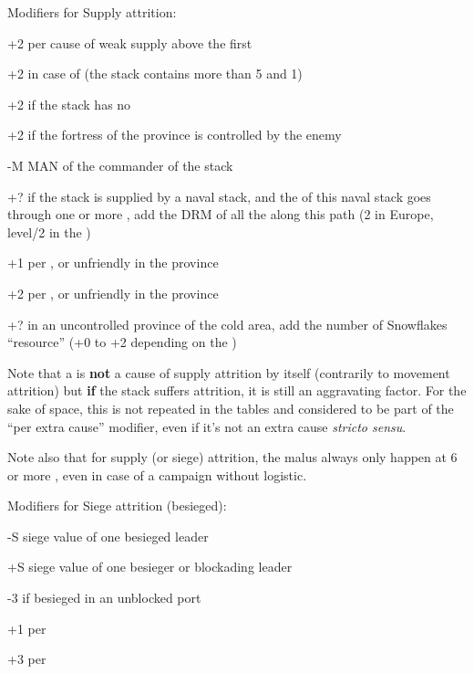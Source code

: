 
Modifiers for Supply attrition:
\begin{modlist}
\item[+2] per cause of weak supply above the first
\item[+2] in case of  (the stack contains more than 5\LD
  and 1\Pasha)
\item[+2] if the stack has no \LoS
\item[+2] if the fortress of the province is controlled by the enemy
\item[-M] MAN of the commander of the stack
\item[+?] if the stack is supplied by a naval stack, and the \LoS of this
  naval stack goes through one or more \StraitFort, add the DRM of all the
  \StraitFort along this path (2 in Europe, level/2 in the \ROTW)
\item[+1] per \PILLAGE\facemoins, \REVOLT\facemoins or unfriendly
  \REBELLION\facemoins in the province
\item[+2] per \PILLAGE\faceplus, \REVOLT\faceplus or unfriendly
  \REBELLION\faceplus in the province
\item[+?] in an uncontrolled province of the \ROTW cold area, add the number
  of Snowflakes ``resource'' (+0 to +2 depending on the \Area)
\end{modlist}

\begin{designnote}
  Note that a  is \textbf{not} a cause of supply attrition
  by itself (contrarily to movement attrition) but \textbf{if} the stack
  suffers attrition, it is still an aggravating factor. For the sake of space,
  this is not repeated in the tables and considered to be part of the ``per
  extra cause'' modifier, even if it's not an extra cause \emph{stricto
    sensu}.

  \smallskip

  Note also that for supply (or siege) attrition, the 
  malus always only happen at 6 or more \LD, even in case of a campaign
  without logistic.
\end{designnote}

Modifiers for Siege attrition (besieged):
\begin{modlist}
\item[-S] siege value of one besieged leader
\item[+S] siege value of one besieger or blockading leader
\item[-3] if besieged in an unblocked port
\item[+1] per \USURE\facemoins
\item[+3] per \USURE\faceplus
\end{modlist}

